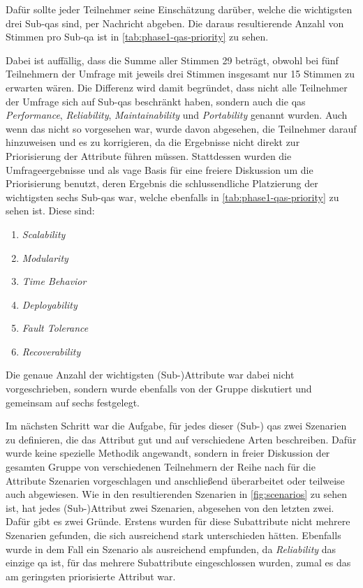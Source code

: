 Dafür sollte jeder Teilnehmer seine Einschätzung darüber, welche die wichtigsten drei Sub-\glspl{qa} sind, per Nachricht abgeben.
Die daraus resultierende Anzahl von Stimmen pro Sub-\gls{qa} ist in \cref{tab:phase1-qas-priority} zu sehen. 

Dabei ist auffällig, dass die Summe aller Stimmen 29 beträgt, obwohl bei fünf Teilnehmern der Umfrage mit jeweils drei Stimmen insgesamt nur 15 Stimmen zu erwarten wären.
Die Differenz wird damit begründet, dass nicht alle Teilnehmer der Umfrage sich auf Sub-\glspl{qa} beschränkt haben, sondern auch die \glspl{qa} \emph{Performance}, \emph{Reliability}, \emph{Maintainability} und \emph{Portability} genannt wurden.
Auch wenn das nicht so vorgesehen war, wurde davon abgesehen, die Teilnehmer darauf hinzuweisen und es zu korrigieren, da die Ergebnisse nicht direkt zur Priorisierung der Attribute führen müssen.
Stattdessen wurden die Umfrageergebnisse und als vage Basis für eine freiere Diskussion um die Priorisierung benutzt, deren Ergebnis die schlussendliche Platzierung der wichtigsten sechs Sub-\glspl{qa} war, welche ebenfalls in \cref{tab:phase1-qas-priority} zu sehen ist.
Diese sind:
\begin{enumerate}
	\item \emph{Scalability}
	\item \emph{Modularity}
	\item \emph{Time Behavior}
	\item \emph{Deployability}
	\item \emph{Fault Tolerance}
	\item \emph{Recoverability}
\end{enumerate}
Die genaue Anzahl der wichtigsten (Sub-)Attribute war dabei nicht vorgeschrieben, sondern wurde ebenfalls von der Gruppe diskutiert und gemeinsam auf sechs festgelegt.

Im nächsten Schritt war die Aufgabe, für jedes dieser (Sub-) \glspl{qa} zwei Szenarien zu definieren, die das Attribut gut und auf verschiedene Arten beschreiben.
Dafür wurde keine spezielle Methodik angewandt, sondern in freier Diskussion der gesamten Gruppe von verschiedenen Teilnehmern der Reihe nach für die Attribute Szenarien vorgeschlagen und anschließend überarbeitet oder teilweise auch abgewiesen.
Wie in den resultierenden Szenarien in \cref{fig:scenarios} zu sehen ist, hat jedes (Sub-)Attribut zwei Szenarien, abgesehen von den letzten zwei.
Dafür gibt es zwei Gründe.
Erstens wurden für diese Subattribute nicht mehrere Szenarien gefunden, die sich ausreichend stark unterschieden hätten.
Ebenfalls wurde in dem Fall ein Szenario als ausreichend empfunden, da \emph{Reliability} das einzige \gls{qa} ist, für das mehrere Subattribute eingeschlossen wurden, zumal es das am geringsten priorisierte Attribut war.

